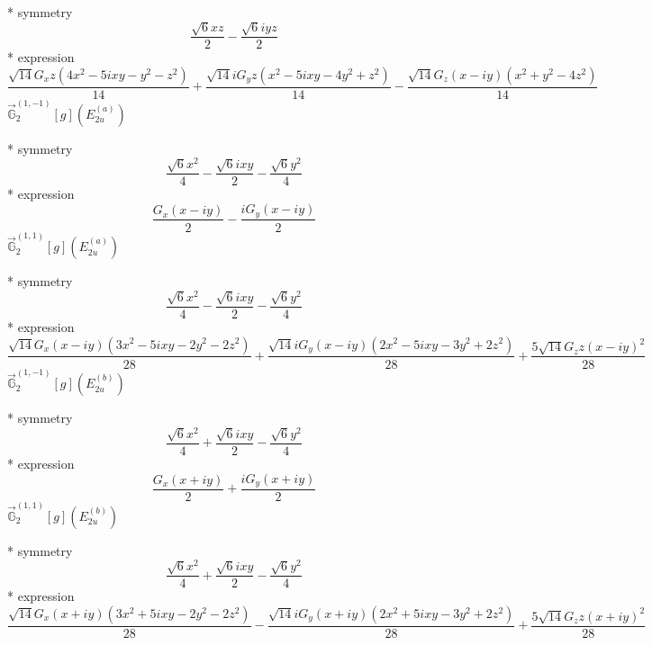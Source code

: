 \documentclass[fleqn,8pt]{jsarticle}
\begin{document}
\noindent\quad ** symmetry
\begin{dmath*}
\frac{\sqrt{6} x z}{2} - \frac{\sqrt{6} i y z}{2}
\end{dmath*}
\noindent\quad ** expression
\begin{dmath*}
\frac{\sqrt{14} G_{x} z \left(4 x^{2} - 5 i x y - y^{2} - z^{2}\right)}{14} + \frac{\sqrt{14} i G_{y} z \left(x^{2} - 5 i x y - 4 y^{2} + z^{2}\right)}{14} - \frac{\sqrt{14} G_{z} \left(x - i y\right) \left(x^{2} + y^{2} - 4 z^{2}\right)}{14}
\end{dmath*}
\noindent\quad $\vec{\mathbb{G}}_{2}^{(1,-1)}[g](E_{2u}^{(a)})$

\noindent\quad ** symmetry
\begin{dmath*}
\frac{\sqrt{6} x^{2}}{4} - \frac{\sqrt{6} i x y}{2} - \frac{\sqrt{6} y^{2}}{4}
\end{dmath*}
\noindent\quad ** expression
\begin{dmath*}
\frac{G_{x} \left(x - i y\right)}{2} - \frac{i G_{y} \left(x - i y\right)}{2}
\end{dmath*}
\noindent\quad $\vec{\mathbb{G}}_{2}^{(1,1)}[g](E_{2u}^{(a)})$

\noindent\quad ** symmetry
\begin{dmath*}
\frac{\sqrt{6} x^{2}}{4} - \frac{\sqrt{6} i x y}{2} - \frac{\sqrt{6} y^{2}}{4}
\end{dmath*}
\noindent\quad ** expression
\begin{dmath*}
\frac{\sqrt{14} G_{x} \left(x - i y\right) \left(3 x^{2} - 5 i x y - 2 y^{2} - 2 z^{2}\right)}{28} + \frac{\sqrt{14} i G_{y} \left(x - i y\right) \left(2 x^{2} - 5 i x y - 3 y^{2} + 2 z^{2}\right)}{28} + \frac{5 \sqrt{14} G_{z} z \left(x - i y\right)^{2}}{28}
\end{dmath*}
\noindent\quad $\vec{\mathbb{G}}_{2}^{(1,-1)}[g](E_{2u}^{(b)})$

\noindent\quad ** symmetry
\begin{dmath*}
\frac{\sqrt{6} x^{2}}{4} + \frac{\sqrt{6} i x y}{2} - \frac{\sqrt{6} y^{2}}{4}
\end{dmath*}
\noindent\quad ** expression
\begin{dmath*}
\frac{G_{x} \left(x + i y\right)}{2} + \frac{i G_{y} \left(x + i y\right)}{2}
\end{dmath*}
\noindent\quad $\vec{\mathbb{G}}_{2}^{(1,1)}[g](E_{2u}^{(b)})$

\noindent\quad ** symmetry
\begin{dmath*}
\frac{\sqrt{6} x^{2}}{4} + \frac{\sqrt{6} i x y}{2} - \frac{\sqrt{6} y^{2}}{4}
\end{dmath*}
\noindent\quad ** expression
\begin{dmath*}
\frac{\sqrt{14} G_{x} \left(x + i y\right) \left(3 x^{2} + 5 i x y - 2 y^{2} - 2 z^{2}\right)}{28} - \frac{\sqrt{14} i G_{y} \left(x + i y\right) \left(2 x^{2} + 5 i x y - 3 y^{2} + 2 z^{2}\right)}{28} + \frac{5 \sqrt{14} G_{z} z \left(x + i y\right)^{2}}{28}
\end{dmath*}
\end{document}
